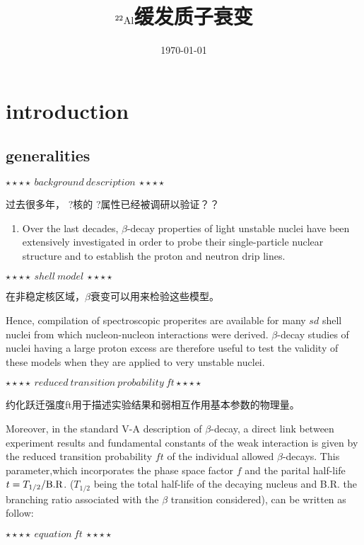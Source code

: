 \documentclass[a4paper]{article}
\title{$^{22}\textnormal{Al}$缓发质子衰变}
\date{\today}
\begin{document}
\maketitle



\section{introduction}
\subsection{generalities}
$\star\star\star\star ~background~description~ \star\star\star\star$

过去很多年， {\color{red}?}核的 {\color{red}?}属性已经被调研以验证？？
\begin{enumerate}
    \item Over the last decades, $\beta$-decay properties of light unstable nuclei have been extensively investigated in order to probe their single-particle nuclear structure and to establish the proton and neutron drip lines.
\end{enumerate}

$\star\star\star\star ~shell ~model~  \star\star\star\star$

在非稳定核区域，$\beta$衰变可以用来检验这些模型。

Hence, compilation of spectroscopic properites are available for many $sd$ shell nuclei from which nucleon-nucleon interactions were derived. $\beta$-decay studies of nuclei having a large proton excess are therefore useful to test the validity of these models when they are applied to very unstable nuclei.

$\star\star\star\star ~reduced ~transition ~probability ~ft \star\star\star\star$

约化跃迁强度ft用于描述实验结果和弱相互作用基本参数的物理量。

Moreover, in the standard V-A description of $\beta$-decay, a direct link between experiment results and fundamental constants of the weak interaction is given by the reduced transition probability $ft$ of the individual allowed $\beta$-decays. This parameter,which incorporates the phase space factor $f$ and the parital half-life $t=T_{1/2}/\rm{B.R}$. ($T_{1/2}$ being the total half-life of the decaying nucleus and B.R. the branching ratio associated with the $\beta$ transition considered), can be written as follow:

$\star\star\star\star~equation~ft~\star\star\star\star$
\end{document}
